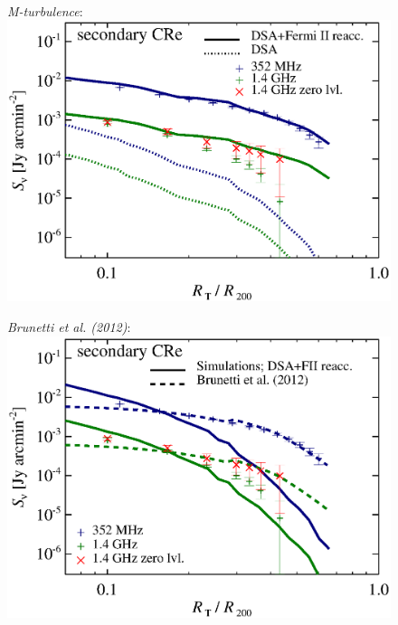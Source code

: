 \documentclass[useAMS,usenatbib]{mn2e}
\newcommand{\Mflatturb}{{\it M-turbulence}\xspace}
\begin{document}
\begin{figure}
\begin{minipage}{1\columnwidth}
\begin{center}
   \end{center}
\end{minipage}
\\
\begin{minipage}{1\columnwidth}
  \begin{center}\Large{\Mflatturb:}\\ 
    \includegraphics[width=\columnwidth]{figures/sbright.nu.DIIcomp.I0.g72a.Rad14.2400p.z0.NL.xKR.eb23.eI066.140.v5.halo.test5.eps}
  \end{center}
\end{minipage}
\begin{minipage}{1\columnwidth}
   \begin{center}\Large{\it Brunetti et al. (2012)}:\\
     \includegraphics[width=\columnwidth]{figures/sbright.nu.DIIcomp.Brunetti.g72a.Rad14.2400p.z0.NL.xKR.eb23.140.v5.halo.test5.eps}

\end{center}
\end{minipage}
\end{figure}
\end{document}
